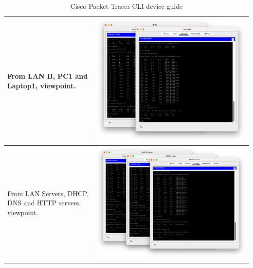 \documentclass[11pt,a4paper]{report}
\begin{document}
\begin{flushleft}
\begin{center}
\begin{longtable}{ m{5cm} l }
                        From LAN B, PC1 and Laptop1, viewpoint.                                                                                                                                                                             & \includegraphics[scale=0.27 ,valign=c]{lanb-outputall}                \\ \hline
                        From LAN Servers, DHCP, DNS and HTTP servers, viewpoint.                                                                                                                                                            & \includegraphics[scale=0.23 ,valign=c]{lanservers-outputall}          \\ \hline

                        \caption{Cisco Packet Tracer CLI device guide}
                        \label{tab:cptg2}
                    \end{longtable}
                \end{center}
        \end{flushleft}
\end{document}

